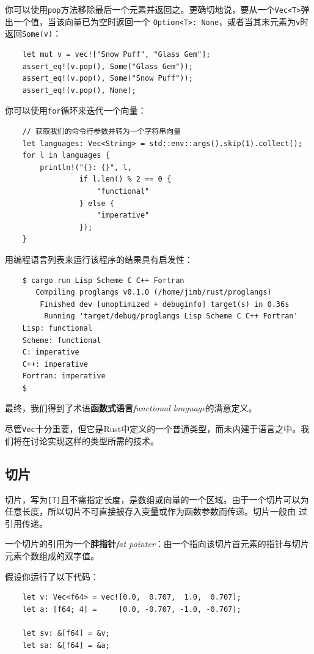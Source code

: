 \smallskip
你可以使用\texttt{pop}方法移除最后一个元素并返回之。更确切地说，要从一个\texttt{Vec<T>}弹出一个值，当该向量已为空时返回一个
\texttt{Option<T>: None}，或者当其末元素为\texttt{v}时返回\texttt{Some(v)}：
\begin{verbatim}
    let mut v = vec!["Snow Puff", "Glass Gem"];
    assert_eq!(v.pop(), Some("Glass Gem"));
    assert_eq!(v.pop(), Some("Snow Puff"));
    assert_eq!(v.pop(), None);
\end{verbatim}
 
\smallskip
你可以使用\texttt{for}循环来迭代一个向量：
\begin{verbatim}
    // 获取我们的命令行参数并转为一个字符串向量
    let languages: Vec<String> = std::env::args().skip(1).collect();
    for l in languages {
        println!("{}: {}", l,
                 if l.len() % 2 == 0 {
                     "functional"
                 } else {
                     "imperative"
                 });
    }
\end{verbatim}
 
\smallskip
用编程语言列表来运行该程序的结果具有启发性：
\begin{verbatim}
    $ cargo run Lisp Scheme C C++ Fortran
       Compiling proglangs v0.1.0 (/home/jimb/rust/proglangs)
        Finished dev [unoptimized + debuginfo] target(s) in 0.36s
         Running 'target/debug/proglangs Lisp Scheme C C++ Fortran'
    Lisp: functional
    Scheme: functional
    C: imperative
    C++: imperative
    Fortran: imperative
    $
\end{verbatim}
 
\smallskip
最终，我们得到了术语\textbf{函数式语言}\textit{functional language}的满意定义。

\medskip
尽管\texttt{Vec}十分重要，但它是Rust中定义的一个普通类型，而未内建于语言之中。我们将在讨论实现这样的类型所需的技术。

\medskip
\subsection{切片}\label{SUBSEC-SLICES}
切片，写为\texttt{[T]}且不需指定长度，是数组或向量的一个区域。由于一个切片可以为任意长度，所以切片不可直接被存入变量或作为函数参数而传递。切片一般由
过引用传递。

\medskip
一个切片的引用为一个\textbf{胖指针}\textit{fat pointer}：由一个指向该切片首元素的指针与切片元素个数组成的双字值。

\medskip
假设你运行了以下代码：
\begin{verbatim}
    let v: Vec<f64> = vec![0.0,  0.707,  1.0,  0.707];
    let a: [f64; 4] =     [0.0, -0.707, -1.0, -0.707];

    let sv: &[f64] = &v;
    let sa: &[f64] = &a;
\end{verbatim}
 
